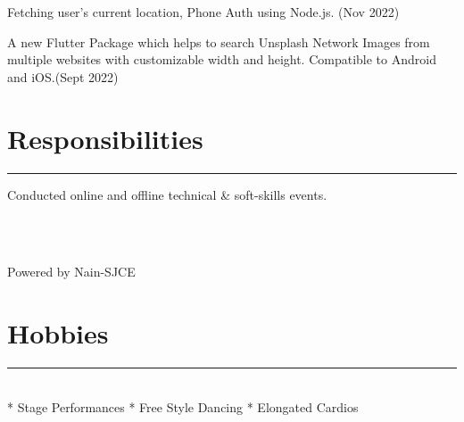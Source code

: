 \documentclass[]{rahulworld-resume}
\begin{document}
\begin{minipage}[t]{0.66\textwidth}
\begin{minipage}{0.85\textwidth\vspace{5pt}}
Fetching user's current location, Phone Auth using Node.js. (Nov 2022)
\end{minipage}
\noindent
\hspace{5em}%
\begin{minipage}{0.85\textwidth\vspace{5pt}}
A new Flutter Package which helps to search Unsplash Network Images from multiple websites with customizable width and height. Compatible to Android and iOS.(Sept 2022)
\end{minipage}




\section{Responsibilities} 
\noindent\rule{12.5cm}{0.4pt}
 

\noindent
\hspace{5em}%
\begin{minipage}{0.85\textwidth\vspace{2pt}}
Conducted online and offline technical & soft-skills events.\end{minipage}\\\\
 
\descript{}
\noindent
\hspace{5em}%
\begin{minipage}{0.85\textwidth\vspace{2pt}}
Powered by Nain-SJCE
\end{minipage}

\section{Hobbies}
\noindent\rule{5cm}{0.4pt}
\vspace{6pt}\\
* Stage Performances  \hspace{1em}
* Free Style Dancing  \hspace{1em}
* Elongated Cardios

\sectionsep

\end{minipage} 
\end{document}
